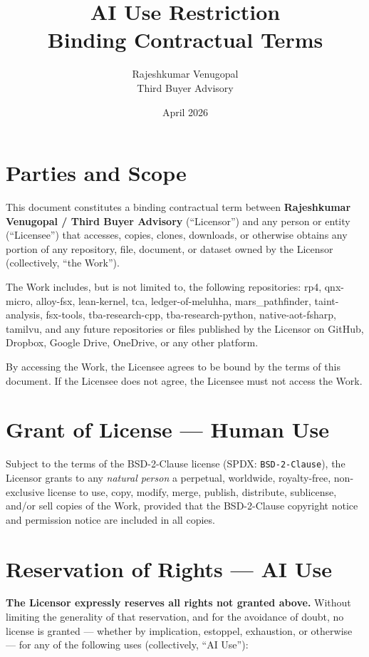 \documentclass[11pt]{article}
\title{\textbf{AI Use Restriction}\\
  \large Binding Contractual Terms}
\author{Rajeshkumar Venugopal \\ Third Buyer Advisory}
\date{April 2026}
\begin{document}
\maketitle

\section{Parties and Scope}

This document constitutes a binding contractual term between
\textbf{Rajeshkumar Venugopal / Third Buyer Advisory} (``Licensor'')
and any person or entity (``Licensee'') that accesses, copies,
clones, downloads, or otherwise obtains any portion of any
repository, file, document, or dataset owned by the Licensor
(collectively, ``the Work'').

The Work includes, but is not limited to, the following
repositories: rp4, qnx-micro, alloy-fsx, lean-kernel, tca,
ledger-of-meluhha, mars\_pathfinder, taint-analysis, fsx-tools,
tba-research-cpp, tba-research-python, native-aot-fsharp, tamilvu,
and any future repositories or files published by the Licensor on
GitHub, Dropbox, Google Drive, OneDrive, or any other platform.

By accessing the Work, the Licensee agrees to be bound by the
terms of this document.  If the Licensee does not agree, the
Licensee must not access the Work.

\section{Grant of License --- Human Use}

Subject to the terms of the BSD-2-Clause license (SPDX:
\texttt{BSD-2-Clause}), the Licensor grants to any \emph{natural
person} a perpetual, worldwide, royalty-free, non-exclusive license
to use, copy, modify, merge, publish, distribute, sublicense,
and/or sell copies of the Work, provided that the BSD-2-Clause
copyright notice and permission notice are included in all copies.

\section{Reservation of Rights --- AI Use}

\textbf{The Licensor expressly reserves all rights not granted
above.}  Without limiting the generality of that reservation, and
for the avoidance of doubt, no license is granted --- whether by
implication, estoppel, exhaustion, or otherwise --- for any of the
following uses (collectively, ``AI Use''):
\end{document}
